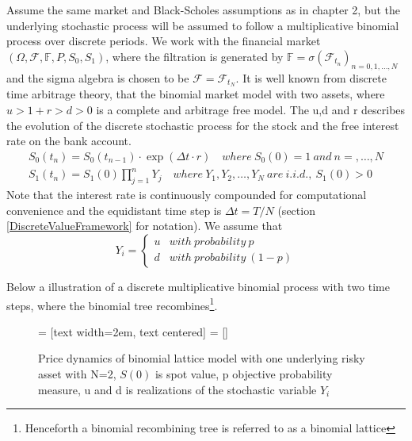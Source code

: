 Assume the same market and Black-Scholes assumptions as in chapter 2, but the underlying stochastic process will be assumed to follow a multiplicative binomial process over discrete periods. We work with the financial market $(\Omega, \mathcal{F}, \mathbb{F}, P, S_0, S_1)$, where the filtration is generated by $\mathbb{F}= \sigma(\mathcal{F}_{t_n})_{n=0,1,\ldots, N}$ and the sigma algebra is chosen to be $\mathcal{F}=\mathcal{F}_{t_{N}}$. It is well known from discrete time arbitrage theory, that the binomial market model with two assets, where $u>1+r>d>0$ is a complete and arbitrage free model. The u,d and r describes the evolution of the discrete stochastic process for the stock and the free interest rate on the bank account. 
\begin{align*}
S_{0}(t_n)=S_{0}(t_{n-1}) \cdot \exp(\Delta t \cdot r) \quad where \ S_{0}(0)=1 \ and \ n=, \ldots, N\\
S_{1}(t_n)=S_{1}(0)\prod_{j=1}^{n} Y_{j} \quad where \ Y_1,Y_2, \ldots, Y_N \ are \ i.i.d., \ S_1(0)>0
\end{align*}
Note that the interest rate is continuously compounded for computational convenience and the equidistant time step is $\Delta t=T/N$ (section \ref{DiscreteValueFramework} for notation). We assume that \[ Y_i = \begin{cases} 
      u & with \ probability \ p \\
      d & with \ probability \ (1-p)
   \end{cases}
\]

Below a illustration of a discrete multiplicative binomial process with two time steps, where the binomial tree recombines\footnote{Henceforth a binomial recombining tree is referred to as a binomial lattice}.\\

\begin{figure}[H]
\centering
 = [text width=2em, text centered]
 = []
\decoRule
\caption[Two Dimensional Binomial Lattice]{Price dynamics of binomial lattice model with one underlying risky asset with N=2, $S(0)$ is spot value, p objective probability measure, u and d is realizations of the stochastic variable $Y_i$}
\label{fig:twoDimLattice}
\end{figure}

